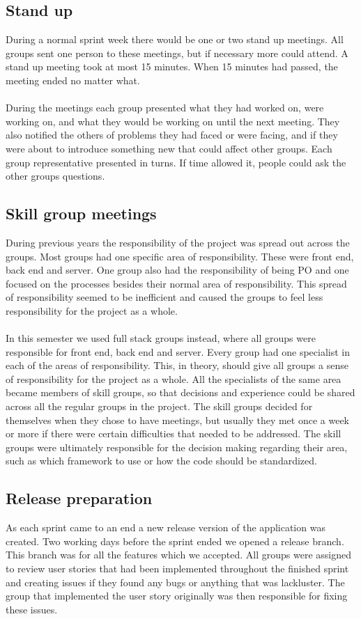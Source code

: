 \subsection{Stand up}
During a normal sprint week there would be one or two stand up meetings.
All groups sent one person to these meetings, but if necessary more could attend.
A stand up meeting took at most 15 minutes.
When 15 minutes had passed, the meeting ended no matter what.
\\
\\
During the meetings each group presented what they had worked on, were working on, and what they would be working on until the next meeting.
They also notified the others of problems they had faced or were facing, and if they were about to introduce something new that could affect other groups.
Each group representative presented in turns. 
If time allowed it, people could ask the other groups questions.

\subsection{Skill group meetings}
During previous years the responsibility of the project was spread out across the groups.
Most groups had one specific area of responsibility.
These were front end, back end and server.
One group also had the responsibility of being PO and one focused on the processes besides their normal area of responsibility.
This spread of responsibility seemed to be inefficient and caused the groups to feel less responsibility for the project as a whole.
\\\\
In this semester we used full stack groups instead, where all groups were responsible for front end, back end and server.
Every group had one specialist in each of the areas of responsibility.
This, in theory, should give all groups a sense of responsibility for the project as a whole.
All the specialists of the same area became members of skill groups, so that decisions and experience could be shared across all the regular groups in the project.
The skill groups decided for themselves when they chose to have meetings, but usually they met once a week or more if there were certain difficulties that needed to be addressed.
The skill groups were ultimately responsible for the decision making regarding their area, such as which framework to use or how the code should be standardized.

\subsection{Release preparation}
As each sprint came to an end a new release version of the application was created.
Two working days before the sprint ended we opened a release branch.
This branch was for all the features which we accepted.
All groups were assigned to review user stories that had been implemented throughout the finished sprint and creating issues if they found any bugs or anything that was lackluster.
The group that implemented the user story originally was then responsible for fixing these issues.

